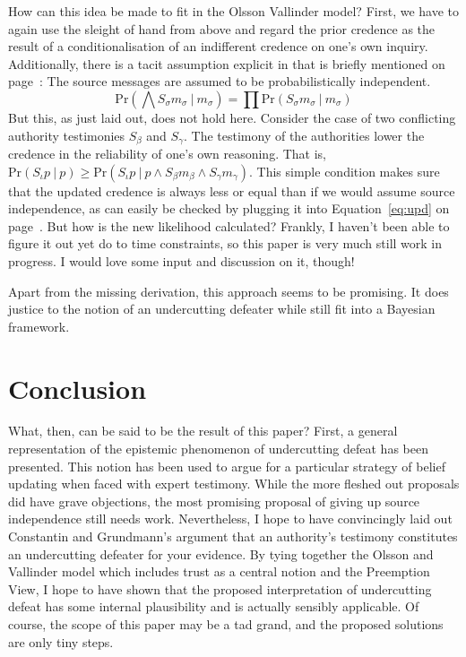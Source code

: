 \documentclass[11pt, a4paper]{scrartcl}
\newcommand{\given}[1][]{\:#1\vert\:}
\renewcommand{\Pr}{\text{Pr}}
\begin{document}
How can this idea be made to fit in the Olsson Vallinder model? First, we have to again use the sleight of hand from above and regard the prior credence as the result of a conditionalisation of an indifferent credence on one's own inquiry. Additionally, there is a tacit assumption explicit in \textcite{Angere2010} that is briefly mentioned on page~\pageref{eq:upd}: The source messages are assumed to be probabilistically independent. 
\[\Pr \left( \bigwedge S_{\sigma}m_\sigma \given m_\sigma\right) = \prod \Pr\left( S_{\sigma}m_\sigma \given m_\sigma\right)\] 
But this, as just laid out, does not hold here. Consider the case of two conflicting authority testimonies $S_\beta$ and $S_\gamma$. The testimony of the authorities lower the credence in the reliability of one's own reasoning. That is, $\Pr(S_\iota p \given p) \geqslant \Pr(S_\iota p \given p \land S_\beta m_\beta \land S_\gamma m_\gamma)$. This simple condition makes sure that the updated credence is always less or equal than if we would assume source independence, as can easily be checked by plugging it into Equation~\ref{eq:upd} on page~\pageref{eq:upd}. But how is the new likelihood calculated? Frankly, I haven't been able to figure it out yet do to time constraints, so this paper is very much still work in progress. I would love some input and discussion on it, though!

Apart from the missing derivation, this approach seems to be promising. It does justice to the notion of an undercutting defeater while still fit into a Bayesian framework. 

\section{Conclusion}


What, then, can be said to be the result of this paper? First, a general representation of the epistemic phenomenon of undercutting defeat has been presented. This notion has been used to argue for a particular strategy of belief updating when faced with expert testimony. While the more fleshed out proposals did have grave objections, the most promising proposal of giving up source independence still needs work. Nevertheless, I hope to have convincingly laid out Constantin and Grundmann's argument that an authority's testimony constitutes an undercutting defeater for your evidence. By tying together the Olsson and Vallinder model which includes trust as a central notion and the Preemption View, I hope to have shown that the proposed interpretation of undercutting defeat has some internal plausibility and is actually sensibly applicable. Of course, the scope of this paper may be a tad grand, and the  proposed solutions are only tiny steps.
\end{document}
